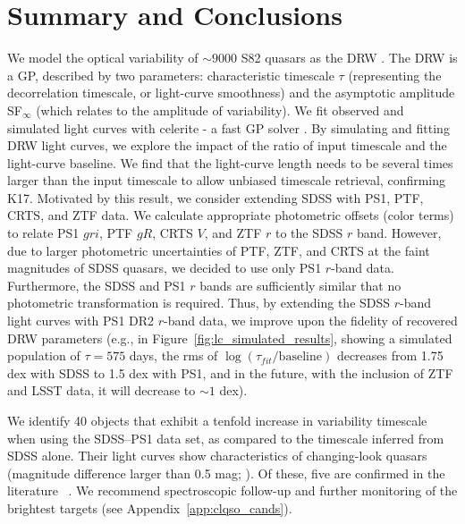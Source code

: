 \documentclass[twocolumn]{aastex62}
\newcommand{\project}[1]{\textsf{#1}}
\begin{document}
%
%
%
%

\section{Summary and Conclusions}
\label{sec:conclusions}
We model the optical variability of ${\sim} 9000$ S82 quasars as the DRW \citep{kelly2009}. The DRW is a GP, described by two parameters: characteristic timescale $\tau$ (representing the decorrelation timescale, or light-curve smoothness) and the asymptotic amplitude SF$_{\infty}$ (which relates to the amplitude of variability). We fit observed and simulated light curves with \project{celerite} - a fast GP solver \citep{foreman2017}. By simulating and fitting DRW light curves, we explore the impact of the ratio of input timescale and the light-curve baseline. We find that the light-curve length needs to be several times larger than the input timescale to allow unbiased timescale retrieval, confirming K17. Motivated by this result, we consider extending SDSS with PS1, PTF, CRTS, and ZTF data.  We calculate appropriate photometric offsets (color terms) to relate PS1 $gri$, PTF $gR$,  CRTS $V$, and ZTF $r$ to the SDSS $r$ band. However, due to larger photometric uncertainties of PTF, ZTF, and CRTS at the faint magnitudes of SDSS quasars, we decided to use only PS1 $r$-band data. Furthermore, the SDSS and PS1 $r$ bands are sufficiently similar that no photometric transformation is required.  Thus, by extending the SDSS $r$-band light curves with PS1 DR2 $r$-band data, we improve upon the fidelity of recovered DRW parameters (e.g., in Figure~\ref{fig:lc_simulated_results}, showing a simulated population of $\tau=575$ days, the rms of $\log{(\tau_{fit}/ \mathrm{baseline})}$ decreases from 1.75 dex with SDSS to 1.5 dex with PS1, and in the future, with the inclusion of ZTF and LSST data, it will decrease to $\sim 1$ dex).  

We identify 40 objects that exhibit a tenfold increase in variability timescale when using the SDSS--PS1 data set, as compared to the timescale inferred from SDSS alone. Their light curves show characteristics of changing-look quasars (magnitude difference larger than 0.5 mag; \citealt{macleod2016}). Of these, five are confirmed in the literature ~\citep{macleod2019, lamassa2015}. We recommend spectroscopic follow-up and further monitoring of the brightest targets (see Appendix~\ref{app:clqso_cands}).
\end{document}
